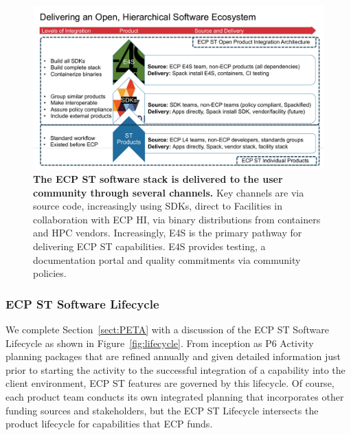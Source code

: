 \begin{figure}
	\centering
	\includegraphics[width=0.9\linewidth]{E4S-Hierarchy}
	\caption{\textbf{The ECP ST software stack is delivered to the user community through several channels.} Key channels are via source code, increasingly using SDKs, direct to Facilities in collaboration with ECP HI, via binary distributions from containers and HPC vendors.  Increasingly, E4S is the primary pathway for delivering ECP ST capabilities.  E4S provides testing, a documentation portal and quality commitments via community policies.}
	\label{fig:hierarchy}
\end{figure}

\subsubsection{ECP ST Software Lifecycle}
We complete Section~\ref{sect:PETA} with a discussion of the ECP ST Software Lifecycle as shown in Figure~\ref{fig:lifecycle}.  From inception as P6 Activity planning packages that are refined annually and given detailed information just prior to starting the activity to the successful integration of a capability into the client environment, ECP ST features are governed by this lifecycle.  Of course, each product team conducts its own integrated planning that incorporates other funding sources and stakeholders, but the ECP ST Lifecycle intersects the product lifecycle for capabilities that ECP funds.

